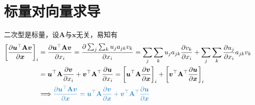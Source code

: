 \documentclass{ctexart}
\newcommand{\blue}[1]{\textcolor{Solarized-blue}{#1}}
\theoremstyle{definition}
\def \uv {\bm{u}}
\def \vv {\bm{v}}
\def \xv {\bm{x}}
\def \Av {\mathbf{A}}
\begin{document}
\section{标量对向量求导}

二次型是标量，设$\Av$与$\xv$无关，易知有
\begin{align*}
    \left[ \frac{\partial \uv^\top \Av \vv}{\partial \xv} \right]_i & = \frac{\partial \uv^\top \Av \vv}{\partial x_i} = \frac{\partial \sum_j \sum_k u_j a_{jk} v_k}{\partial x_i} = \sum_j \sum_k u_j a_{jk} \frac{\partial v_k}{\partial x_i} + \sum_j \sum_k \frac{\partial u_j}{\partial x_i} a_{jk} v_k         \\
                                                                    & = \uv^\top \Av \frac{\partial \vv}{\partial x_i} + \vv^\top \Av^\top \frac{\partial \uv}{\partial x_i} = \left[ \uv^\top \Av \frac{\partial \vv}{\partial \xv} \right]_i + \left[ \vv^\top \Av^\top \frac{\partial \uv}{\partial \xv} \right]_i \\
                                                                    & \Longrightarrow \blue{\frac{\partial \uv^\top \Av \vv}{\partial \xv} = \uv^\top \Av \frac{\partial \vv}{\partial \xv} + \vv^\top \Av^\top \frac{\partial \uv}{\partial \xv}}
\end{align*}
\end{document}
